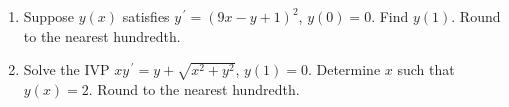 \documentclass{ximera}
\begin{document}
\begin{enumerate}[label=(\arabic*)]




\begin{enumerate}[label=(\alph*)]
\item $\sqrt{x+y}+\ln(1-\sqrt{x+y}\,)=-\dfrac{x}{2}$  %
\item $\sqrt{x+y}-\ln(1-\sqrt{x+y}\,)=-\dfrac{x}{2}$
\item $\sqrt{x+y}+\ln(1-\sqrt{x+y}\,)=-x$
\item $\sqrt{x+y}-\ln(1-\sqrt{x+y}\,)=-x$
\item $y - \ln|x+y+1|=-\dfrac{x}{2}$
\item $y+\ln|x+y+1|=-\dfrac{x}{2}$
\end{enumerate}



\item Suppose $y(x)$ satisfies $y^{\,\prime}=(9x-y+1)^{2}$, $y(0)=0$.  Find $y(1)$.  Round to the nearest hundredth.












\item Solve the IVP $xy^{\,\prime}=y+\sqrt{x^2+y^2}$, $y(1)=0$.  Determine $x$ such that $y(x)=2$.  Round to the nearest hundredth.



\end{enumerate}
\end{document}
